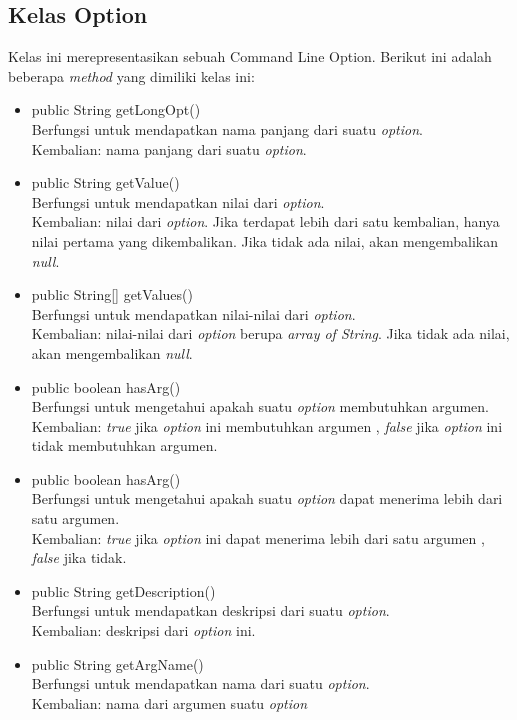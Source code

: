 \subsection{Kelas Option}
\label{subsec:option}
Kelas ini merepresentasikan sebuah Command Line Option. Berikut ini adalah beberapa \textit{method} yang dimiliki kelas ini: 
\begin{itemize}
\item public String getLongOpt()\\
Berfungsi untuk mendapatkan nama panjang dari suatu \textit{option}.\\
Kembalian: nama panjang dari suatu \textit{option}.
\item public String getValue()\\
Berfungsi untuk mendapatkan nilai dari \textit{option}.\\
Kembalian: nilai dari \textit{option}. Jika terdapat lebih dari satu kembalian, hanya nilai pertama yang dikembalikan. Jika tidak ada nilai, akan mengembalikan \textit{null}.

\item public String[] getValues()\\
Berfungsi untuk mendapatkan nilai-nilai dari \textit{option}.\\
Kembalian: nilai-nilai dari \textit{option} berupa \textit{array of String}. Jika tidak ada nilai, akan mengembalikan \textit{null}.

\item public boolean hasArg()\\
Berfungsi untuk mengetahui apakah suatu \textit{option} membutuhkan argumen.\\
Kembalian: \textit{true} jika \textit{option} ini membutuhkan argumen , \textit{false} jika \textit{option} ini tidak membutuhkan argumen.

\item public boolean hasArg()\\
Berfungsi untuk mengetahui apakah suatu \textit{option} dapat menerima lebih dari satu argumen.\\
Kembalian: \textit{true} jika \textit{option} ini dapat menerima lebih dari satu argumen , \textit{false} jika tidak.

\item public String getDescription()\\
Berfungsi untuk mendapatkan deskripsi dari suatu \textit{option}.\\
Kembalian: deskripsi dari \textit{option} ini.
\item public String getArgName()\\
Berfungsi untuk mendapatkan nama dari suatu \textit{option}.\\
Kembalian: nama dari argumen suatu \textit{option}


\end{itemize}

